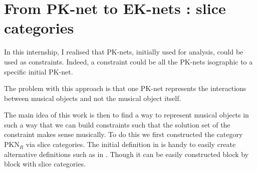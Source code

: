 \section{From PK-net to EK-nets : slice categories}
In this internship, I realised that PK-nets, initially used for analysis, could be used as constraints. Indeed, a constraint could be all the PK-nets isographic to a specific initial PK-net.

The problem with this approach is that one PK-net represents the interactions between musical objects and not the musical object itself.



The main idea of this work is then to find a way to represent musical objects in such a way that we can build constraints such that the solution set of the constraint makes sense musically. To do this we first constructed the category $\text{PKN}_R$ via slice categories. The initial definition in \cite{popoff2015categorical} is handy to easily create alternative definitions such as in \cite{popoff2016relational}. Though it can be easily constructed block by block with slice categories.



